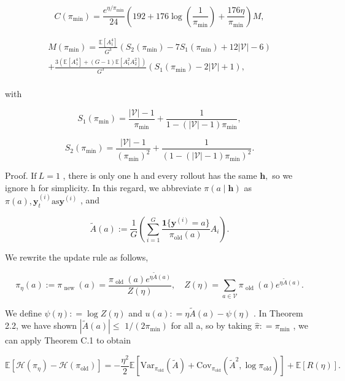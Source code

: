 \documentclass[
  10
]{article}
\begin{document}
\[
C (\pi_ {\min}) = \frac {e ^ {\eta / \pi_ {\min}}}{2 4} \left(1 9 2 + 1 7 6 \log \left(\frac {1}{\pi_ {\min}}\right) + \frac {1 7 6 \eta}{\pi_ {\min}}\right) M,
\]

\[
\begin{array}{l} {M (\pi_ {\mathrm{min}})} = {\frac {\mathbb {E} [ A _ {1} ^ {4} ]}{G ^ {3}} (S _ {2} (\pi_ {\mathrm{min}}) - 7 S _ {1} (\pi_ {\mathrm{min}}) + 1 2 | \mathcal {V} | - 6)} \\ { + } { \frac { 3 ( \mathbb { E } [ A _ { 1 } ^ { 4 } ] + ( G - 1 ) \mathbb { E } [ A _ { 1 } ^ { 2 } A _ { 2 } ^ { 2 } ] ) } { G ^ { 3 } } ( S _ { 1 } ( \pi _ { \operatorname* { m i n } } ) - 2 | \mathcal { V } | + 1 ) , } \\ \end{array}
\]

with

\[
S _ {1} (\pi_ {\min}) = \frac {| \mathcal {V} | - 1}{\pi_ {\min}} + \frac {1}{1 - (| \mathcal {V} | - 1) \pi_ {\min}},
\]

\[
S _ {2} (\pi_ {\mathrm{min}}) = \frac {| \mathcal {V} | - 1}{(\pi_ {\mathrm{min}}) ^ {2}} + \frac {1}{(1 - (| \mathcal {V} | - 1) \pi_ {\mathrm{min}}) ^ {2}}.
\]

Proof. \(\mathrm { I f } \ L = 1\) , there is only one h and every
rollout has the same \(\mathbf { h } ,\) so we ignore h for simplicity.
In this regard, we abbreviate \(\pi ( a \mid \mathbf { h } )\) as
\(\pi ( a ) , \mathbf { y } _ { t } ^ { ( i ) } \mathrm { a s } \mathbf { y } ^ { ( i ) }\)
, and

\[
\tilde {A} (a) := \frac {1}{G} \left(\sum_ {i = 1} ^ {G} \frac {\mathbf {1} \{\mathbf {y} ^ {(i)} = a \}}{\pi_ {\mathrm{old}} (a)} A _ {i}\right).
\]

We rewrite the update rule as follows,

\[
\pi_ {\eta} (a) := \pi_ {\text { new }} (a) = \frac {\pi_ {\text { old }} (a) e ^ {\eta \tilde {A} (a)}}{Z (\eta)}, \quad Z (\eta) = \sum_ {a \in \mathcal {V}} \pi_ {\text { old }} (a) e ^ {\eta \tilde {A} (a)}.
\]

We define \(\psi ( \eta ) : = \log Z ( \eta )\) and
\(u ( a ) : = \eta \tilde { A } ( a ) - \psi ( \eta )\) . In Theorem
2.2, we have shown \(| \tilde { A } ( a ) | \leq\)
\(1 / ( 2 \pi _ { \mathrm { m i n } } )\) for all a, so by taking
\(\hat { \pi } : = \pi _ { \operatorname* { m i n } }\) , we can apply
Theorem C.1 to obtain

\[
\mathbb {E} [ \mathcal {H} (\pi_ {\eta}) - \mathcal {H} (\pi_ {\mathrm{old}}) ] = - \frac {\eta^ {2}}{2} \mathbb {E} [ \mathrm{Var} _ {\pi_ {\mathrm{old}}} (\tilde {A}) + \mathrm{Cov} _ {\pi_ {\mathrm{old}}} (\tilde {A} ^ {2}, \log \pi_ {\mathrm{old}}) ] + \mathbb {E} [ R (\eta) ].
\]
\end{document}
